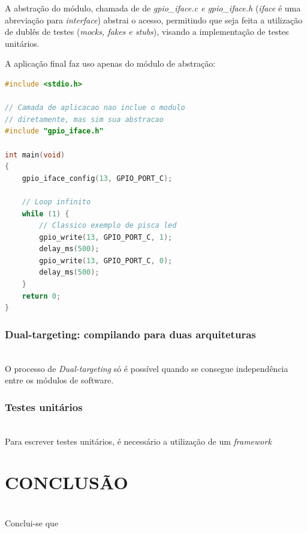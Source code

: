 \documentclass[times, twoside, watermark]{artigo}
\begin{document}
A abstração do módulo, chamada de de \textit{gpio\_iface.c e gpio\_iface.h} 
(\textit{iface} é uma abreviação para \textit{interface}) abstrai o 
acesso, permitindo que seja feita a utilização de dublês de testes (\textit{mocks, 
fakes e stubs}), visando a implementação de testes unitários.

A aplicação final faz uso apenas do módulo de abstração:

\begin{lstlisting}[language=C, caption=Camada de aplicação - main.c]
#include <stdio.h>

// Camada de aplicacao nao inclue o modulo
// diretamente, mas sim sua abstracao
#include "gpio_iface.h"

int main(void)
{
    gpio_iface_config(13, GPIO_PORT_C);
    
    // Loop infinito
    while (1) {
        // Classico exemplo de pisca led
        gpio_write(13, GPIO_PORT_C, 1);
        delay_ms(500);
        gpio_write(13, GPIO_PORT_C, 0);
        delay_ms(500);
    }
    return 0;
}
\end{lstlisting}


\subsubsection{Dual-targeting: compilando para duas arquiteturas}\hfill\\

O processo de \textit{Dual-targeting} só é possível quando se consegue independência
entre os módulos de software.


\subsubsection{Testes unitários}\hfill\\

Para escrever testes unitários, é necessário a utilização de um \textit{framework}


\section{CONCLUSÃO}\hfill\\
Conclui-se que 



\end{document}
